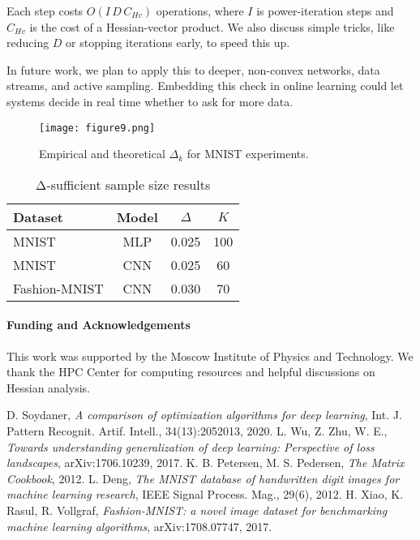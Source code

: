 \documentclass[a4paper,12pt]{article}
\begin{document}
Each step costs $O(I\,D\,C_{Hv})$ operations, where $I$ is power-iteration steps and $C_{Hv}$ is the cost of a Hessian-vector product. We also discuss simple tricks, like reducing $D$ or stopping iterations early, to speed this up.

In future work, we plan to apply this to deeper, non-convex networks, data streams, and active sampling. Embedding this check in online learning could let systems decide in real time whether to ask for more data.

\begin{figure}[h]
  \centering
  \texttt{[image: figure9.png]}
  \caption{Empirical and theoretical $\Delta_k$ for MNIST experiments.}
  \label{fig:delta}
\end{figure}

\begin{table}[h]
  \centering
  \caption{Δ-sufficient sample size results}
  \begin{tabular}{lccc}
    \hline
    Dataset       & Model & $\Delta$ & $K$ \\
    \hline
    MNIST         & MLP   & 0.025    & 100 \\
    MNIST         & CNN   & 0.025    & 60  \\
    Fashion-MNIST & CNN   & 0.030    & 70  \\
    \hline
  \end{tabular}
\end{table}

\paragraph{Funding and Acknowledgements}
This work was supported by the Moscow Institute of Physics and Technology. We thank the HPC Center for computing resources and helpful discussions on Hessian analysis.

\begin{thebibliography}{9}
   D. Soydaner, \textit{A comparison of optimization algorithms for deep learning}, Int. J. Pattern Recognit. Artif. Intell., 34(13):2052013, 2020.
   L. Wu, Z. Zhu, W. E., \textit{Towards understanding generalization of deep learning: Perspective of loss landscapes}, arXiv:1706.10239, 2017.
   K. B. Petersen, M. S. Pedersen, \textit{The Matrix Cookbook}, 2012.
   L. Deng, \textit{The MNIST database of handwritten digit images for machine learning research}, IEEE Signal Process. Mag., 29(6), 2012.
   H. Xiao, K. Rasul, R. Vollgraf, \textit{Fashion-MNIST: a novel image dataset for benchmarking machine learning algorithms}, arXiv:1708.07747, 2017.
\end{thebibliography}
\end{document}
